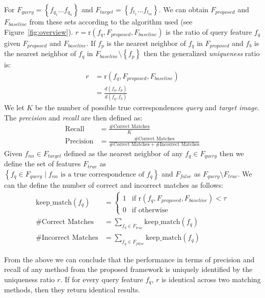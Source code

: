 \documentclass[journal]{IEEEtran}
\newcommand{\twopartdef}[4]
{
	\left\{
		\begin{array}{ll}
			#1 & \mbox{if } #2 \\
			#3 & \mbox{if } #4
		\end{array}
	\right.
}
\begin{document}
For $F_{query} = \left\{f_{q_1} \ldots f_{q_n}\right\}$ and $F_{target} 
= \left\{f_{t_1} \ldots f_{t_m}\right\}$.  We can obtain $F_{proposed}$ 
and $F_{baseline}$ from these sets according to the algorithm used (see 
Figure~\ref{fig:overview}). $r = \text{r}(f_{q}, F_{proposed}, 
F_{baseline})$ is the ratio of query feature $f_{q}$ given 
$F_{proposed}$ and $F_{baseline}$.  If $f_{p}$ is the nearest neighbor 
of $f_{q}$ in $F_{proposed}$ and $f_{b}$ is the nearest neighbor of 
$f_{q}$ in $F_{baseline} \setminus \left\{f_{p}\right\}$ then the 
generalized \emph{uniqueness} ratio is:
\begin{align*}
    r &= \text{r}(f_{q}, F_{proposed}, F_{baseline}) \\
        &= \frac{d(f_{q}, f_{p})}{d(f_{q}, f_{b})}
\end{align*}
We let $K$ be the number of possible true correspondences \emph{query} 
and \emph{target image}. The \emph{precision} and \emph{recall} are then 
defined as:
\begin{align*}
    \textrm{Recall} &= \frac{\#\textrm{Correct Matches}}{K} \\
    \textrm{Precision} &= \frac{\#\textrm{Correct 
    Matches}}{\#\textrm{Correct Matches} + \#\textrm{Incorrect Matches}}
\end{align*}
Given $f_{nn} \in F_{target}$ defined as the nearest neighbor of any 
$f_q \in F_{query}$ then we define the set of features $F_{true}$ as 
$\left\{ f_{q} \in F_{query} \mid f_{nn} \text{ is a true correspondence 
of } f_{q} \right\}$ and $F_{false}$ as $F_{query} \setminus F_{true}$.  
We can the define the number of correct and incorrect matches as 
follows:
\begin{align*}
    \textrm{keep\_match}(f_{q}) &= \twopartdef{ 1 }{\text{r}(f_{q}, 
    F_{proposed}, F_{baseline}) <
    \tau}{0}{\textrm{otherwise}} \\
    \#\textrm{Correct Matches} &= \sum_{f_{q} \in F_{true}} 
    \textrm{keep\_match}(f_{q})\\
    \#\textrm{Incorrect Matches} &= \sum_{f_{q} \in F_{false}}
    \textrm{keep\_match}(f_{q})
\end{align*}

From the above we can conclude that the performance in terms of 
precision and recall of any method from the proposed framework is 
uniquely identified by the uniqueness ratio $r$.  If for every query 
feature $f_{q}$, $r$ is identical across two matching methods, then they 
return identical results. 
\end{document}
